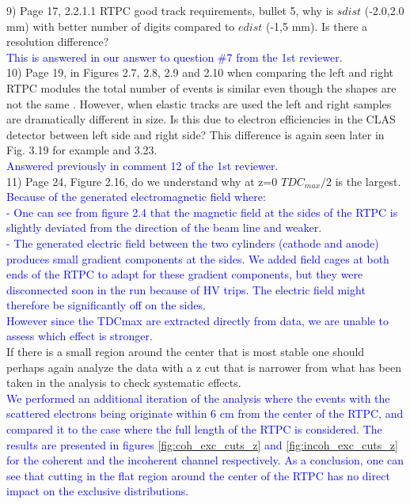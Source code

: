 9) Page 17, 2.2.1.1 RTPC good track requirements, bullet 5, why is $sdist$  
(-2.0,2.0 mm) with better number of digits compared to $edist$ (-1,5 mm).  Is 
there a resolution difference?\\
\textcolor{blue}{ This is answered in our answer to question \#7 from the 1st 
reviewer. } \\

10) Page 19,  in Figures 2.7, 2.8, 2.9 and 2.10 when comparing the left and right 
RTPC modules the total number of events is similar even though the shapes are 
not the same . However, when elastic tracks are used the left and right samples 
are dramatically different in size. Is this due to electron efficiencies in the 
CLAS detector between left side and right side? This difference is again seen 
later in Fig. 3.19 for example and 3.23.\\
 \textcolor{blue}{ Answered previously in comment 12 of the 1st reviewer.  }\\


11) Page 24, Figure 2.16, do we understand why at z=0 $TDC_{max}/2$ is the 
largest.\\
  \textcolor{blue}{
Because of the generated electromagnetic field where:\\
- One can see from figure 2.4 that the magnetic field at the sides of the RTPC 
is slightly deviated from the direction of the beam line and weaker. \\
- The generated electric field between the two cylinders (cathode and anode) 
produces small gradient components at the sides. We added field cages at both 
ends of the RTPC to adapt for these gradient components, but they were 
disconnected soon in the run because of HV trips. The electric field might 
therefore be significantly off on the sides. \\
However since the TDCmax are extracted directly from data, we are unable to 
assess which effect is stronger.}\\

If there is a small region around the center that is most stable one should 
perhaps again analyze the data with a z cut that is narrower from what has been 
taken in the analysis to check systematic effects.\\
  \textcolor{blue}{ We performed an additional iteration of the analysis where 
  the events with the scattered electrons being originate within 6 cm from the 
  center of the RTPC, and compared it to the case where the full length of the 
  RTPC is considered. The results are presented in figures 
  \ref{fig:coh_exc_cuts_z} and \ref{fig:incoh_exc_cuts_z} for the coherent and 
  the incoherent channel respectively. As a conclusion, one can see that 
  cutting in the flat region around the center of the RTPC has no direct impact 
  on the exclusive distributions. }\\ 
  
